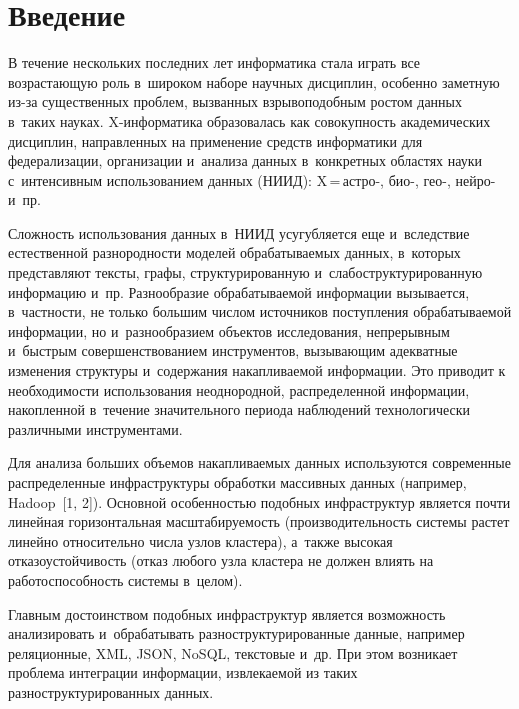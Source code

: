 


\thispagestyle{headings}

\begin{multicols}{2}

\label{st\stat}

\section{Введение}


  В течение нескольких последних лет информатика стала играть все возрастающую роль
в~широком наборе научных дисциплин, особенно заметную из-за существенных проблем,
вызванных взрывоподобным ростом данных в~таких науках.\linebreak
 X-информатика образовалась
как совокупность академических дисциплин, направленных на применение средств
информатики для федерализации, организации и~анализа данных в~конкретных областях
науки с~интенсивным использованием данных (НИИД): X\,=\,астро-, био-, гео-, нейро- и~пр.

  Сложность использования данных в~НИИД усугубляется еще и~вследствие естественной
разнородности моделей обрабатываемых данных, в~которых представляют тексты, графы,
структурированную и~слабоструктурированную информацию и~пр. Разнообразие
обрабатываемой информации вызывается, в~частности, не только большим числом
источников поступления обрабатываемой информации, но и~разнообразием объектов
исследования, непрерывным и~быстрым совершенствованием инструментов, вызывающим
адекватные изменения структуры и~содержания накапливаемой информации. Это приводит
к необходимости использования неоднородной, распределенной информации, накопленной
в~течение значительного периода наблюдений технологически различными инструментами.

  Для анализа больших объемов накапливаемых данных используются современные
распределенные инфраструктуры обработки массивных данных (например, Hadoop~[1, 2]).
Основной особенностью подобных инфраструктур является почти линейная горизонтальная
масштабируемость (производительность системы растет линейно относительно числа узлов
кластера), а~также высокая отказоустойчивость (отказ любого узла кластера не должен
влиять на работоспособность системы в~целом).

  Главным достоинством подобных инфраструктур является возможность анализировать
и~обрабатывать разноструктурированные данные, например реляционные, XML, JSON,
NoSQL, текстовые и~др. При этом возникает проблема интеграции информации,
извлекаемой из таких разноструктурированных данных.


\end{multicols}
